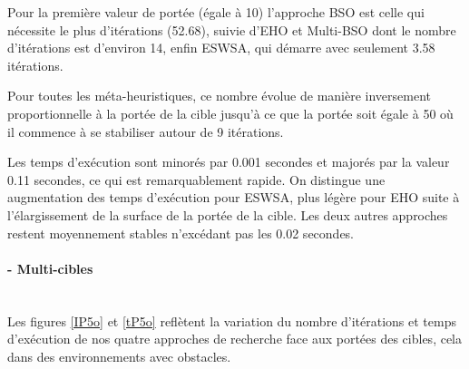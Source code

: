 	Pour la première valeur de portée (égale à 10) l'approche BSO est celle qui nécessite le plus d'itérations (52.68), suivie d'EHO et Multi-BSO dont le nombre d'itérations est d'environ 14, enfin ESWSA, qui démarre avec seulement 3.58 itérations. 
	
	Pour toutes les méta-heuristiques, ce nombre évolue de manière inversement proportionnelle à la portée de la cible jusqu'à ce que la portée soit égale à 50 où il commence à se stabiliser autour de 9 itérations.\\
	\vspace{-0.2cm}
	
	Les temps d'exécution sont minorés par 0.001 secondes et majorés par la valeur 0.11 secondes, ce qui est remarquablement rapide. On distingue une augmentation des temps d'exécution pour ESWSA, plus légère pour EHO suite à l'élargissement de la surface de la portée de la cible. Les deux autres approches restent moyennement stables n'excédant pas les 0.02 secondes.   
	
	
	\vspace{-0.1cm}
	\noindent
	\hspace{-0.5cm}
	\begin{minipage}[t]{0.55\textwidth}
		\captionsetup{width=0.8\linewidth}
		\centering{}
		\label{IP1o}
	\end{minipage}\hfill
	\hspace{-0.5cm}
	\begin{minipage}[t]{0.55\textwidth}
		\captionsetup{width=0.8\linewidth}
		\centering{}
		\label{tP1o}
	\end{minipage}\hfill
	
	
	\paragraph{- Multi-cibles}
	\textbf{ }\\
	Les figures \ref{IP5o} et \ref{tP5o} reflètent la variation du nombre d'itérations et temps d'exécution de nos quatre approches de recherche face aux portées des cibles, cela dans des environnements avec obstacles.\\
	
